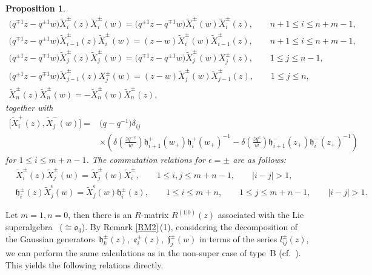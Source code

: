 \documentclass[pdftex]{sigma}
\numberwithin{equation}{section}
\newtheorem{Proposition}[Theorem]{Proposition}
 { \theoremstyle{definition}
\newtheorem{Definition}[Theorem]{Definition}
\newtheorem{Note}[Theorem]{Note}
\newtheorem{Example}[Theorem]{Example}
\newtheorem{Remark}[Theorem]{Remark} }
\begin{document}
\begin{Proposition}
\begin{gather*}
 \bigl(q^{\mp1}z-q^{\pm1}w\bigr)\widetilde{X}_i^{\pm}(z)\widetilde{X}_i^{\pm}(w)=\bigl(q^{\pm1}z-q^{\mp1}w\bigr)\widetilde{X}_i^{\pm}(w)\widetilde{X}_i^{\pm}(z),\qquad n+1\leq i\leq n+m-1,\\
 \bigl(q^{\mp1}z-q^{\pm1}w\bigr)\widetilde{X}_{i-1}^{\pm}(z)\widetilde{X}_{i}^{\pm}(w)=(z-w)\widetilde{X}_{i}^{\pm}(w)\widetilde{X}_{i-1}^{\pm}(z),\qquad n+1\leq i\leq n+m-1,\\
 \bigl(q^{\pm1}z-q^{\mp1}w\bigr)\widetilde{X}_j^{\pm}(z)\widetilde{X}_j^{\pm}(w)=\bigl(q^{\mp1}z-q^{\pm1}w\bigr)\widetilde{X}_j^{\pm}(w)X_j^{\pm}(z),\qquad 1\leq j\leq n-1,\\
 \bigl(q^{\pm1}z-q^{\mp1}w\bigr)\widetilde{X}_{j-1}^{\pm}(z)X_{j}^{\pm}(w)=(z-w)\widetilde{X}_{j}^{\pm}(w)\widetilde{X}_{j-1}^{\pm}(z),\qquad 1\leq j\leq n,\\
 \widetilde{X}_{n}^{\pm}(z)\widetilde{X}_{n}^{\pm}(w)=-\widetilde{X}_{n}^{\pm}(w)\widetilde{X}_{n}^{\pm}(z),
\end{gather*}
together with
\begin{align*}
 \bigl[\widetilde{X}_i^{+}(z), \widetilde{X}_j^{-}(w)\bigr]={}&\bigl(q-q^{-1}\bigr)\delta_{ij}\\
 &\times\left(\delta\left(\frac{zq^{-c}}{w}\right)\mathfrak{h}_{i+1}^+(w_+)
 \mathfrak{h}_i^+(w_+)^{-1}-\delta\left(\frac{zq^{c}}{w}\right)\mathfrak{h}_{i+1}^-(z_+)\mathfrak{h}_i^-(z_+)^{-1}\right)
\end{align*}
for $1\leq i\leq m+n-1$. The commutation relations for $\epsilon=\pm$ are as follows:
\begin{align*}
 &\widetilde{X}_i^{\pm}(z)\widetilde{X}_j^{\pm}(w)=\widetilde{X}_j^{\pm}(w)\widetilde{X}_i^{\pm}, \qquad 1\leq i,j \leq m+n-1,\qquad |i-j|>1,\\
 &\mathfrak{h}_i^{\pm}(z)\widetilde{X}_j^{\epsilon}(w)=\widetilde{X}_j^{\epsilon}(w)\mathfrak{h}_i^{\pm}(z), \qquad 1\leq i \leq m+n,\qquad 1\leq j \leq m+n-1,\qquad |i-j|>1.
\end{align*}
\end{Proposition}

Let $m=1, n=0$, then there is an $R$-matrix $R^{(1|0)}(z)$ associated with the Lie superalgebra~ ($\cong \mathfrak{o}_3$). By Remark \ref{RM2}\,(1), considering the decomposition of the Gaussian generators~$\mathfrak{h}_k^{\pm}(z)$,~$\mathfrak{e}_i^{\pm}(z)$,~$\mathfrak{f}_j^{\pm}(w)$ in terms of the series $l^{\pm}_{ij}(z)$, we can perform the same calculations as in the non-super case of type~B (cf.\ \cite[Lemmas 4.8--4.11]{JMAB}). This yields the following relations directly.
\end{document}
